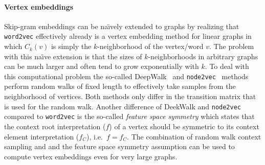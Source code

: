 \paragraph{Vertex embeddings}
Skip-gram embeddings can be  na{\"\i}vely extended to graphs by realizing that \texttt{word2vec} effectively already is a vertex embedding method for linear graphs in which $C_k(v)$ is simply the $k$-neighborhood of the vertex/word $v$.
The problem with this na{\"\i}ve extension is that the sizes of $k$-neighborhoods in arbitrary graphs can be much larger and often tend to grow exponentially with $k$.
To deal with this computational problem the so-called DeepWalk~\cite{Perozzi2014} and \texttt{node2vec}~\cite{Grover2016} methods perform random walks of fixed length to effectively take samples from the neighborhood of vertices.
Both methods only differ in the transition matrix that is used for the random walk.
Another difference of DeekWalk and \texttt{node2vec} compared to \texttt{word2vec} is the so-called \textit{feature space symmetry} which states that the context root interpretation ($f$) of a vertex should be symmetric to its context element interpretation ($f_C$), i.e.\ $f = f_C$.
The combination of random walk context sampling and and the feature space symmetry assumption can be used to compute vertex embeddings even for very large graphs.

